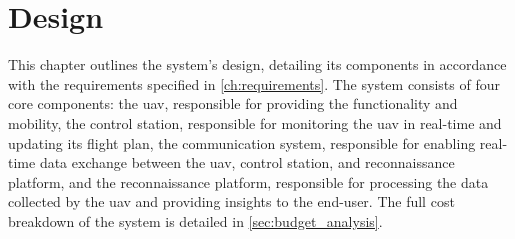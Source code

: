 \chapter{Design}\label{ch:design}

This chapter outlines the system's design, detailing its components in accordance with the requirements specified in \cref{ch:requirements}. The system consists of four core components: the \gls{uav}, responsible for providing the functionality and mobility, the control station, responsible for monitoring the \gls{uav} in real-time and updating its flight plan, the communication system, responsible for enabling real-time data exchange between the \gls{uav}, control station, and reconnaissance platform, and the reconnaissance platform, responsible for processing the data collected by the \gls{uav} and providing insights to the end-user. The full cost breakdown of the system is detailed in \cref{sec:budget_analysis}.







